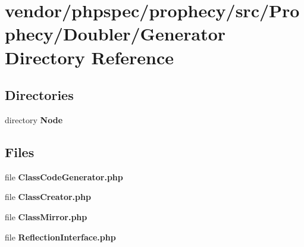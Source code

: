 \section{vendor/phpspec/prophecy/src/\+Prophecy/\+Doubler/\+Generator Directory Reference}
\label{dir_29a128f76b1e05149d83fa01bd7d570d}
\subsection*{Directories}
\begin{DoxyCompactItemize}
\item 
directory {\bf Node}
\end{DoxyCompactItemize}
\subsection*{Files}
\begin{DoxyCompactItemize}
\item 
file {\bf Class\+Code\+Generator.\+php}
\item 
file {\bf Class\+Creator.\+php}
\item 
file {\bf Class\+Mirror.\+php}
\item 
file {\bf Reflection\+Interface.\+php}
\end{DoxyCompactItemize}
